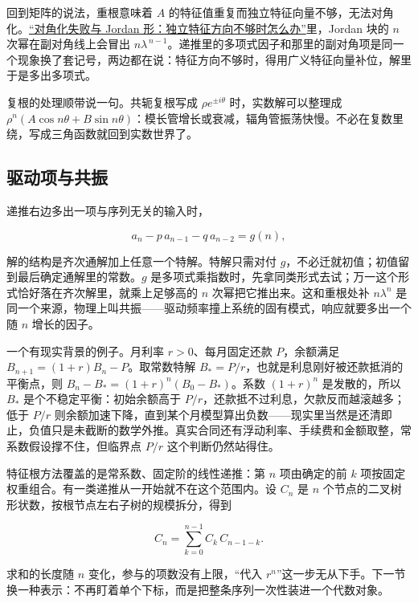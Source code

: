 回到矩阵的说法，重根意味着 \(A\) 的特征值重复而独立特征向量不够，无法对角化。\hyperref[sec:03-Linear-Algebra/05-Eigenvalues-and-Eigenvectors/03]{``对角化失败与 Jordan 形：独立特征方向不够时怎么办''}里，Jordan 块的 \(n\) 次幂在副对角线上会冒出 \(n\lambda^{\,n-1}\)。递推里的多项式因子和那里的副对角项是同一个现象换了套记号，两边都在说：特征方向不够时，得用广义特征向量补位，解里于是多出多项式。

复根的处理顺带说一句。共轭复根写成 \(\rho e^{\pm i\theta}\) 时，实数解可以整理成 \(\rho^{n}(A\cos n\theta+B\sin n\theta)\)：模长管增长或衰减，辐角管振荡快慢。不必在复数里绕，写成三角函数就回到实数世界了。

\subsection{驱动项与共振}

递推右边多出一项与序列无关的输入时，

\[
a_n-p\,a_{n-1}-q\,a_{n-2}=g(n),
\]

解的结构是齐次通解加上任意一个特解。特解只需对付 \(g\)，不必迁就初值；初值留到最后确定通解里的常数。\(g\) 是多项式乘指数时，先拿同类形式去试；万一这个形式恰好落在齐次解里，就乘上足够高的 \(n\) 次幂把它推出来。这和重根处补 \(n\lambda^{n}\) 是同一个来源，物理上叫共振——驱动频率撞上系统的固有模式，响应就要多出一个随 \(n\) 增长的因子。

一个有现实背景的例子。月利率 \(r>0\)、每月固定还款 \(P\)，余额满足 \(B_{n+1}=(1+r)B_n-P\)。取常数特解 \(B_*=P/r\)，也就是利息刚好被还款抵消的平衡点，则 \(B_n-B_*=(1+r)^{n}(B_0-B_*)\)。系数 \((1+r)^{n}\) 是发散的，所以 \(B_*\) 是个不稳定平衡：初始余额高于 \(P/r\)，还款抵不过利息，欠款反而越滚越多；低于 \(P/r\) 则余额加速下降，直到某个月模型算出负数——现实里当然是还清即止，负值只是未截断的数学外推。真实合同还有浮动利率、手续费和金额取整，常系数假设撑不住，但临界点 \(P/r\) 这个判断仍然站得住。

特征根方法覆盖的是常系数、固定阶的线性递推：第 \(n\) 项由确定的前 \(k\) 项按固定权重组合。有一类递推从一开始就不在这个范围内。设 \(C_n\) 是 \(n\) 个节点的二叉树形状数，按根节点左右子树的规模拆分，得到

\[
C_n=\sum_{k=0}^{n-1}C_k\,C_{n-1-k}.
\]

求和的长度随 \(n\) 变化，参与的项数没有上限，``代入 \(r^{n}\)''这一步无从下手。下一节换一种表示：不再盯着单个下标，而是把整条序列一次性装进一个代数对象。
